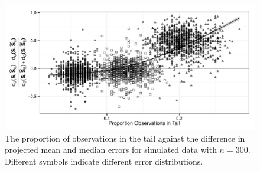 \begin{figure}[h!]
\centering
\includegraphics[width=.8\textwidth]{Nu75N300TailBehaviorStandard}
\caption{The proportion of observations in the tail against the difference in projected mean and median errors for simulated data with $n=300$.  Different symbols indicate different error distributions.}
\label{fig:SimTail}
\end{figure}

